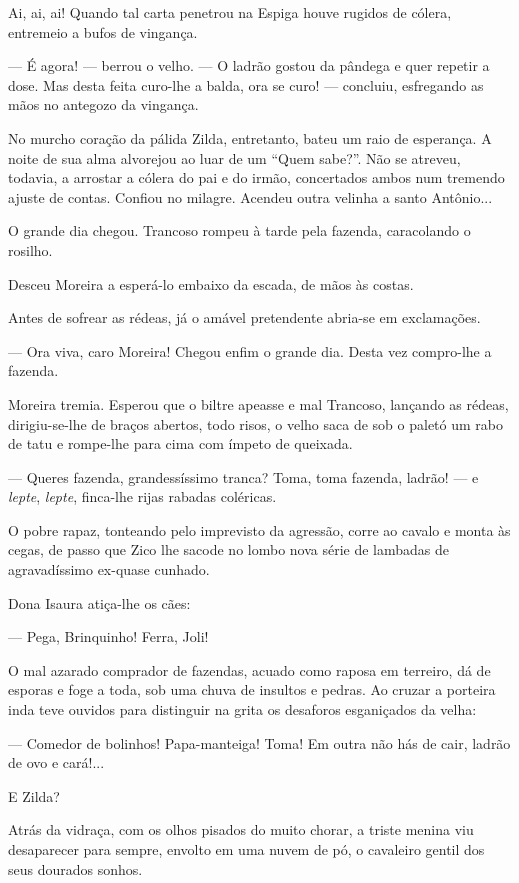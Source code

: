 Ai, ai, ai! Quando tal carta penetrou na Espiga houve rugidos de cólera,
entremeio a bufos de vingança.

--- É agora! --- berrou o velho. --- O ladrão gostou da pândega e quer
repetir a dose. Mas desta feita curo-lhe a balda, ora se curo! ---
concluiu, esfregando as mãos no antegozo da vingança.

No murcho coração da pálida Zilda, entretanto, bateu um raio de
esperança. A noite de sua alma alvorejou ao luar de um ``Quem sabe?''.
Não se atreveu, todavia, a arrostar a cólera do pai e do irmão,
concertados ambos num tremendo ajuste de contas. Confiou no milagre.
Acendeu outra velinha a santo Antônio...

O grande dia chegou. Trancoso rompeu à tarde pela fazenda, caracolando o
rosilho.

Desceu Moreira a esperá-lo embaixo da escada, de mãos às costas.

Antes de sofrear as rédeas, já o amável pretendente abria-se em
exclamações.

--- Ora viva, caro Moreira! Chegou enfim o grande dia. Desta vez
compro-lhe a fazenda.

Moreira tremia. Esperou que o biltre apeasse e mal Trancoso, lançando as
rédeas, dirigiu-se-lhe de braços abertos, todo risos, o velho saca de
sob o paletó um rabo de tatu e rompe-lhe para cima com ímpeto de
queixada.

--- Queres fazenda, grandessíssimo tranca? Toma, toma fazenda, ladrão!
--- e \emph{lepte}, \emph{lepte}, finca-lhe rijas rabadas coléricas.

O pobre rapaz, tonteando pelo imprevisto da agressão, corre ao cavalo e
monta às cegas, de passo que Zico lhe sacode no lombo nova série de
lambadas de agravadíssimo ex-quase cunhado.

Dona Isaura atiça-lhe os cães:

--- Pega, Brinquinho! Ferra, Joli!

O mal azarado comprador de fazendas, acuado como raposa em terreiro, dá
de esporas e foge a toda, sob uma chuva de insultos e pedras. Ao cruzar
a porteira inda teve ouvidos para distinguir na grita os desaforos
esganiçados da velha:

--- Comedor de bolinhos! Papa-manteiga! Toma! Em outra não hás de cair,
ladrão de ovo e cará!...

E Zilda?

Atrás da vidraça, com os olhos pisados do muito chorar, a triste menina
viu desaparecer para sempre, envolto em uma nuvem de pó, o cavaleiro
gentil dos seus dourados sonhos.

